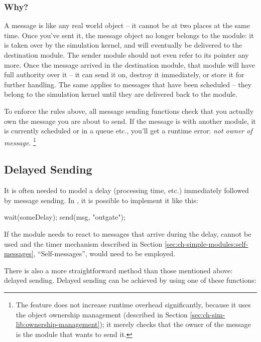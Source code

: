 \subsubsection{Why?}

A message is like any real world object -- it cannot be at two places
at the same time. Once you've sent it, the message object
no longer belongs to the module: it is taken over by the simulation kernel,
and will eventually be delivered to the destination module.
The sender module should not even refer to its pointer any more.
Once the message arrived in the destination module, that module
will have full authority over it -- it can send it on,
destroy it immediately, or store it for further handling.
The same applies to messages that have been scheduled -- they
belong to the simulation kernel until they are delivered back to
the module.

To enforce the rules above, all message sending functions
check that you actually own the message you are about to send.
If the message is with another module, it is currently scheduled or
in a queue etc., you'll get a runtime error: \textit{not owner of message}.
  \footnote{The feature does not increase runtime overhead significantly, because
  it uses the object ownership management (described in
  Section \ref{sec:ch-sim-lib:ownership-management});
  it merely checks that the owner of the message is the module that
  wants to send it.}



\subsection{Delayed Sending}
\label{sec:simple-modules:delayed-sending}

It is often needed to model a delay (processing time, etc.) immediately
followed by message sending. In {\opp}, it is possible to implement
it like this:

\begin{cpp}
wait(someDelay);
send(msg, "outgate");
\end{cpp}


If the module needs to react to messages that arrive during the delay,
 cannot be used and the timer mechanism described in
Section \ref{sec:ch-simple-modules:self-messages}, ``Self-messages'', would
need to be employed.


There is also a more straightforward method than those mentioned above:
delayed sending. Delayed sending can be achieved
by using one of these functions:


